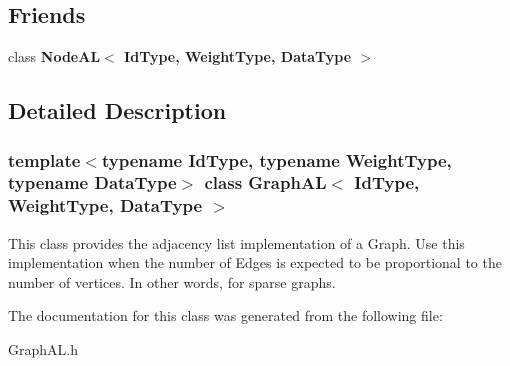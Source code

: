 \subsection*{Friends}
\begin{DoxyCompactItemize}
\item 
\mbox{\label{class_graph_a_l_aaf57e680e124479357b702bd8d974494}} 
class {\bfseries Node\+A\+L$<$ Id\+Type, Weight\+Type, Data\+Type $>$}
\end{DoxyCompactItemize}


\subsection{Detailed Description}
\subsubsection*{template$<$typename Id\+Type, typename Weight\+Type, typename Data\+Type$>$\newline
class Graph\+A\+L$<$ Id\+Type, Weight\+Type, Data\+Type $>$}

This class provides the adjacency list implementation of a Graph. Use this implementation when the number of Edges is expected to be proportional to the number of vertices. In other words, for sparse graphs. 

The documentation for this class was generated from the following file\+:\begin{DoxyCompactItemize}
\item 
Graph\+A\+L.\+h\end{DoxyCompactItemize}
